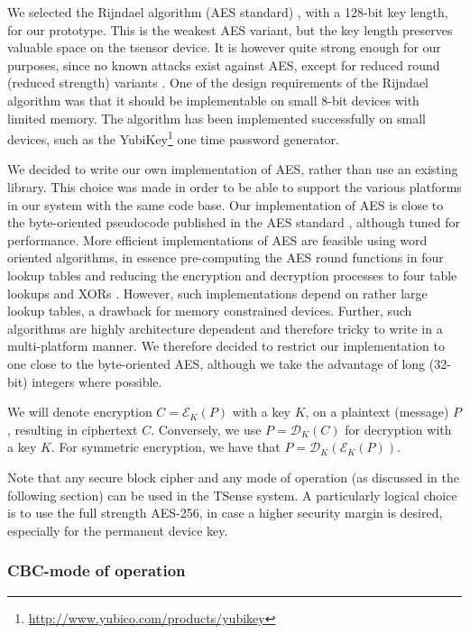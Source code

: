 We selected the Rijndael algorithm (AES standard) , with a 128-bit key length, for our prototype. This is the weakest AES variant, but the key length preserves valuable space on the tsensor device. It is however quite strong enough for our purposes, since no known attacks exist against AES, except for reduced round (reduced strength) variants \cite{}. One of the design requirements of the Rijndael algorithm was that it should be implementable on small 8-bit devices with limited memory. The algorithm has been implemented successfully on small devices, such as the YubiKey\footnote{\url{http://www.yubico.com/products/yubikey}} one time password generator.

We decided to write our own implementation of AES, rather than use an existing library. This choice was made in order to be able to support the various platforms in our system with the same code base. Our implementation of AES is close to the byte-oriented pseudocode published in the AES standard , although tuned for performance. More efficient implementations of AES are feasible using word oriented algorithms, in essence pre-computing the AES round functions in four lookup tables and reducing the encryption and decryption processes to four table lookups and XORs \cite[Section 5.2]{daemen1999}. However, such implementations depend on rather large lookup tables, a drawback for memory constrained devices. Further, such algorithms are highly architecture dependent and therefore tricky to write in a multi-platform manner. We therefore decided to restrict our implementation to one close to the byte-oriented AES, although we take the advantage of long (32-bit) integers where possible.

We will denote encryption $C=\mathcal{E}_K(P)$ with a key $K$, on a plaintext (message) $P$, resulting in ciphertext $C$. Conversely, we use $P=\mathcal{D}_K(C)$ for decryption with a key $K$. For symmetric encryption, we have that $P=\mathcal{D}_K(\mathcal{E}_K(P))$.

Note that any secure block cipher and any mode of operation (as discussed in the following section) can be used in the TSense system. A particularly logical choice is to use the full strength AES-256, in case a higher security margin is desired, especially for the permanent device key.

\subsubsection{CBC-mode of operation}

